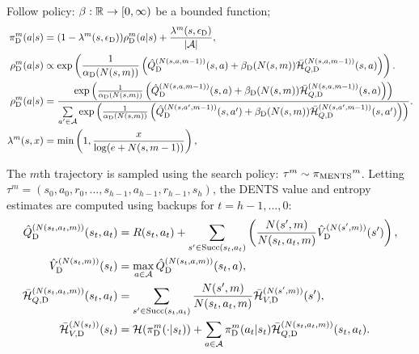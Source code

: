     Follow policy: 
     $\beta : \mathbb{R}\rightarrow [0,\infty)$ be a bounded function; 
    \begin{align}
        {\pi^{m}_{{\textnormal{D}}}}(a|s) &= (1-{\lambda^{m}(s,{\epsilon_{{\textnormal{D}}}})}){\rho^{m}_{{\textnormal{D}}}}(a|s) + \frac{{\lambda^{m}(s,{\epsilon_{{\textnormal{D}}}})}}{|\mathcal{A}|}, 
            \label{appeq:dents_search_policy}  \\
        {\rho^{m}_{{\textnormal{D}}}}(a|s) &\propto \exp\left(\frac{1}{{\alpha_{{\textnormal{D}}}}(N(s,m))}
            \left({\hat{Q}^{(N(s,a,m-1))}_{{\textnormal{D}}}}(s,a) + {\beta_{{\textnormal{D}}}}(N(s,m)){\bar{\mathcal{H}}^{(N(s,a,m-1))}_{Q,{\textnormal{D}}}}(s,a) \right)\right). \\
        {\rho^{m}_{{\textnormal{D}}}}(a|s) &= \frac{
            \exp\left(\frac{1}{{\alpha_{{\textnormal{D}}}}(N(s,m))}\left(
                {\hat{Q}^{(N(s,a,m-1))}_{{\textnormal{D}}}}(s,a) + {\beta_{{\textnormal{D}}}}(N(s,m)){\bar{\mathcal{H}}^{(N(s,a,m-1))}_{Q,{\textnormal{D}}}}(s,a)   \right)\right)
            }{\sum\limits_{a'\in\mathcal{A}} \exp\left(\frac{1}{{\alpha_{{\textnormal{D}}}}(N(s,m))}\left(
                {\hat{Q}^{(N(s,a',m-1))}_{{\textnormal{D}}}}(s,a') + {\beta_{{\textnormal{D}}}}(N(s,m)){\bar{\mathcal{H}}^{(N(s,a',m-1))}_{Q,{\textnormal{D}}}}(s,a')  \right)\right)}.  
            \label{appeq:full_rho} \\
        \lambda^m(s,x) &= \min\left(1, \frac{x}{\log(e+N(s,m-1))}\right), 
    \end{align}

    The $m$th trajectory is sampled using the search policy: $\tau^m \sim {\pi_{{\textnormal{MENTS}}}}^m$. Letting $\tau^m=(s_0,a_0,r_0,...,s_{h-1},a_{h-1},r_{h-1},s_{h})$, the DENTS value and entropy estimates are computed using backups for $t=h-1, ..., 0$: 
    \begin{align}
        {\hat{Q}^{(N(s_t,a_t,m))}_{{\textnormal{D}}}}(s_t,a_t) &= 
            R(s_t,a_t) + \sum_{s' \in {\textnormal{Succ}(s_t,a_t)}} \left( 
                \frac{N(s',m)}{N(s_t,a_t,m)} {\hat{V}^{(N(s',m))}_{{\textnormal{D}}}}(s') \right), 
            \label{appeq:dp_q_backup} \\ 
        {\hat{V}^{(N(s_t,m))}_{{\textnormal{D}}}}(s_t) &=\max_{a\in\mathcal{A}} {\hat{Q}^{(N(s_t,a,m))}_{{\textnormal{D}}}}(s_t,a), 
            \label{appeq:dp_v_backup} \\
        {\bar{\mathcal{H}}^{(N(s_t,a_t,m))}_{Q,{\textnormal{D}}}}(s_t,a_t) &= 
            \sum_{s'\in {\textnormal{Succ}(s_t,a_t)}} \frac{N(s',m)}{N(s_t,a_t,m)} {\bar{\mathcal{H}}^{(N(s',m))}_{V,{\textnormal{D}}}}(s'), \\
        {\bar{\mathcal{H}}^{(N(s_t))}_{V,{\textnormal{D}}}}(s_t) &= 
            \mathcal{H}({\pi^{m}_{{\textnormal{D}}}}(\cdot | s_t)) 
                + \sum_{a\in\mathcal{A}} {\pi^{m}_{{\textnormal{D}}}}(a_t|s_t){\bar{\mathcal{H}}^{(N(s_t,a_t,m))}_{Q,{\textnormal{D}}}}(s_t,a_t).
    \end{align}

